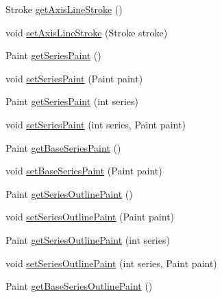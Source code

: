 \begin{DoxyCompactItemize}
\item 
Stroke \mbox{\hyperlink{classorg_1_1jfree_1_1chart_1_1plot_1_1_spider_web_plot_a18a070016d28ddeeff19529dbb1ca0eb}{get\+Axis\+Line\+Stroke}} ()
\item 
void \mbox{\hyperlink{classorg_1_1jfree_1_1chart_1_1plot_1_1_spider_web_plot_a9643dc83b765d2e02295a4f08369b5a4}{set\+Axis\+Line\+Stroke}} (Stroke stroke)
\item 
Paint \mbox{\hyperlink{classorg_1_1jfree_1_1chart_1_1plot_1_1_spider_web_plot_a55ac552ac5f9a7f6101abcf71140e61c}{get\+Series\+Paint}} ()
\item 
void \mbox{\hyperlink{classorg_1_1jfree_1_1chart_1_1plot_1_1_spider_web_plot_ada5fa71ef3e684aeeadd43027093c47a}{set\+Series\+Paint}} (Paint paint)
\item 
Paint \mbox{\hyperlink{classorg_1_1jfree_1_1chart_1_1plot_1_1_spider_web_plot_aaabad5cb6e0209877572a9ddd69ed4dc}{get\+Series\+Paint}} (int series)
\item 
void \mbox{\hyperlink{classorg_1_1jfree_1_1chart_1_1plot_1_1_spider_web_plot_af6e4b9783a9e1cb17decded263b28166}{set\+Series\+Paint}} (int series, Paint paint)
\item 
Paint \mbox{\hyperlink{classorg_1_1jfree_1_1chart_1_1plot_1_1_spider_web_plot_ad894e0dd3eaa6a2d887f6d18f724cc30}{get\+Base\+Series\+Paint}} ()
\item 
void \mbox{\hyperlink{classorg_1_1jfree_1_1chart_1_1plot_1_1_spider_web_plot_ab62b188899ac692b78f78765ad0d0e1b}{set\+Base\+Series\+Paint}} (Paint paint)
\item 
Paint \mbox{\hyperlink{classorg_1_1jfree_1_1chart_1_1plot_1_1_spider_web_plot_a3b53e7767027e4ffb571420e3488cb4d}{get\+Series\+Outline\+Paint}} ()
\item 
void \mbox{\hyperlink{classorg_1_1jfree_1_1chart_1_1plot_1_1_spider_web_plot_a720b14b880a33b305771cf6413281198}{set\+Series\+Outline\+Paint}} (Paint paint)
\item 
Paint \mbox{\hyperlink{classorg_1_1jfree_1_1chart_1_1plot_1_1_spider_web_plot_a2b12e37fb12c368e70fd749584f04efe}{get\+Series\+Outline\+Paint}} (int series)
\item 
void \mbox{\hyperlink{classorg_1_1jfree_1_1chart_1_1plot_1_1_spider_web_plot_aa223eeac74e98d4397f24209aa921e0b}{set\+Series\+Outline\+Paint}} (int series, Paint paint)
\item 
Paint \mbox{\hyperlink{classorg_1_1jfree_1_1chart_1_1plot_1_1_spider_web_plot_a7205fdee6144d8dd81316692b3c8f8a7}{get\+Base\+Series\+Outline\+Paint}} ()
\item 

\end{DoxyCompactItemize}
